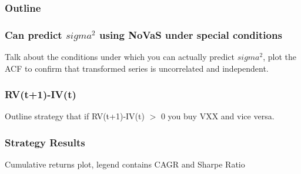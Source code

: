 \documentclass{beamer}
\begin{document}
\begin{frame}
\frametitle{Outline}
\tableofcontents[currentsection]
\end{frame}

\begin{frame}
\frametitle{Can predict $sigma^2$ using NoVaS under special conditions}
Talk about the conditions under which you can actually predict $sigma^2$, plot the ACF to confirm that transformed series is uncorrelated and independent.
\end{frame}

\begin{frame}
\frametitle{RV(t+1)-IV(t)}
Outline strategy that if RV(t+1)-IV(t) $>$ 0 you buy VXX and vice versa.
\end{frame}

\begin{frame}
\frametitle{Strategy Results}
Cumulative returns plot, legend contains CAGR and Sharpe Ratio
\end{frame}
\end{document}
